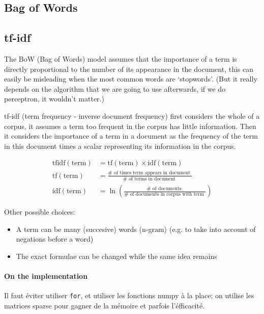 \documentclass{article}
\begin{document}
\subsection{Bag of Words}

\subsection{tf-idf}

The BoW (Bag of Words) model assumes that the importance of a term is directly proportional to
the number of its appearance in the document, this can easily be misleading
when the most common words are `stopwords'. (But it really depends on
the algorithm that we are going to use afterwards, if we do perceptron, it wouldn't matter.)

tf-idf (term frequency - inverse document frequency) first considers
the whole of a corpus, it assumes a term too frequent in the corpus has little
information. Then it considers the importance of a term in a document
as the frequency of the term in this document times a scalar
representing its information in the corpus.

$$
\begin{aligned}
\mathrm{tfidf}(\mathrm{term}) & = \mathrm{tf}(\mathrm{term}) \times \mathrm{idf}(\mathrm{term}) \\
\mathrm{tf}(\mathrm{term}) & = \frac{\# \text { of times term appears in document }}{\# \text { of terms in document }} \\
\mathrm{idf}(\mathrm{term}) & =\ln \left(\frac{\# \text { of documents }}{\# \text { of documents in corpus with term }}\right)
\end{aligned}
$$

Other possible choices:

\begin{itemize}
  \item A term can be many (succesive) words (n-gram) (e.g. to
  take into account of negations before a word)
  \item The exact formulae can be changed while the same idea remains
\end{itemize}

\paragraph{On the implementation} Il faut éviter utiliser \verb|for|, et
utiliser les fonctions numpy à la place; on utilise les matrices sparse pour
gagner de la mémoire et parfois l'éfficacité.
\end{document}
